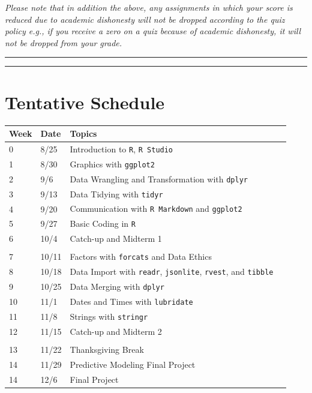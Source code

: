 \documentclass[
]{book}
\begin{document}
\emph{Please note that in addition the above, any assignments in which your score is reduced due to academic dishonesty will not be dropped according to the quiz policy e.g., if you receive a zero on a quiz because of academic dishonesty, it will not be dropped from your grade.}

\begin{center}\rule{0.5\linewidth}{0.5pt}\end{center}

\begin{center}\rule{0.5\linewidth}{0.5pt}\end{center}

\hypertarget{tentative-schedule}{%
\section{Tentative Schedule}\label{tentative-schedule}}

\begin{longtable}[]{@{}llll@{}}
\toprule
Week & Date & Topics & \\
\midrule
\endhead
0 & 8/25 & Introduction to \texttt{R}, \texttt{R\ Studio} & \\
1 & 8/30 & Graphics with \texttt{ggplot2} & \\
2 & 9/6 & Data Wrangling and Transformation with \texttt{dplyr} & \\
3 & 9/13 & Data Tidying with \texttt{tidyr} & \\
4 & 9/20 & Communication with \texttt{R\ Markdown} and \texttt{ggplot2} & \\
5 & 9/27 & Basic Coding in \texttt{R} & \\
6 & 10/4 & Catch-up and Midterm 1 & \\
& & & \\
7 & 10/11 & Factors with \texttt{forcats} and Data Ethics & \\
8 & 10/18 & Data Import with \texttt{readr}, \texttt{jsonlite}, \texttt{rvest}, and \texttt{tibble} & \\
9 & 10/25 & Data Merging with \texttt{dplyr} & \\
10 & 11/1 & Dates and Times with \texttt{lubridate} & \\
11 & 11/8 & Strings with \texttt{stringr} & \\
12 & 11/15 & Catch-up and Midterm 2 & \\
& & & \\
13 & 11/22 & Thanksgiving Break & \\
14 & 11/29 & Predictive Modeling Final Project & \\
14 & 12/6 & Final Project & \\
\bottomrule
\end{longtable}
\end{document}
